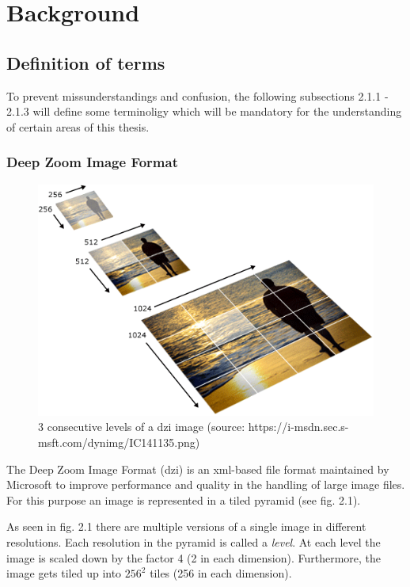 \chapter{Background}

\section{Definition of terms}

To prevent missunderstandings and confusion, the following subsections 2.1.1 - 2.1.3 will define some terminoligy which will be mandatory for the understanding of certain areas of this thesis.


\subsection{Deep Zoom Image Format}

\begin{figure}[H]
	\begin{center}
		\includegraphics[scale=0.5]{img/dzi_pyramid.png}
		\caption{3 consecutive levels of a dzi image (source: https://i-msdn.sec.s-msft.com/dynimg/IC141135.png)}
		\label{fig:fig2.1}
	\end{center}
\end{figure}

The Deep Zoom Image Format (dzi) is an xml-based file format maintained by Microsoft to improve performance and quality in the handling of large image files. For this purpose an image is represented in a tiled pyramid (see fig. 2.1).

As seen in fig. 2.1 there are multiple versions of a single image in different resolutions. Each resolution in the pyramid is called a \emph{level}. At each level the image is scaled down by the factor 4 (2 in each dimension). Furthermore, the image gets tiled up into $256^2$ tiles (256 in each dimension)\cite{web:dzi}.

